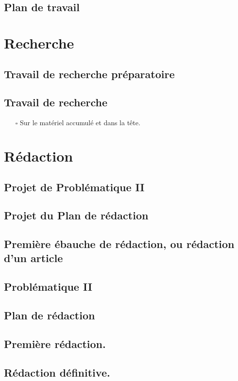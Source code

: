 \documentclass[paper=A4,portrait,twoside=true,twocolumn=false,headinclude=false,footinclude=false,fontsize=11,BCOR=15mm,DIV=calc,pagesize=auto,titlepage=firstiscover,mpinclude=true,headings=normal,headings=twolinechapter,open=right,chapterprefix=false,headsepline=false]{scrbook}
\begin{document}
\chapter{Plan de travail}
\label{sec:org2f6cdcc}
\part{Recherche}
\label{sec:org08d4bd3}
\chapter{Travail de recherche préparatoire}
\label{sec:orge5e0aad}
\chapter{Travail de recherche}
\label{sec:orgc071241}
\begin{itemize}
\item[{$\square$}] Sur le matériel accumulé et dans la tête.
\end{itemize}
\part{Rédaction}
\label{sec:orgc238240}
\chapter{Projet de Problématique II}
\label{sec:org143b951}
\chapter{Projet du Plan de rédaction}
\label{sec:orgeca151d}
\chapter{Première ébauche de rédaction, ou rédaction d'un article}
\label{sec:org47167f6}
\chapter{Problématique II}
\label{sec:org91befbc}
\chapter{Plan de rédaction}
\label{sec:orge5ef626}
\chapter{Première rédaction.}
\label{sec:org089abfc}
\chapter{Rédaction définitive.}
\label{sec:org9272f96}
\end{document}
